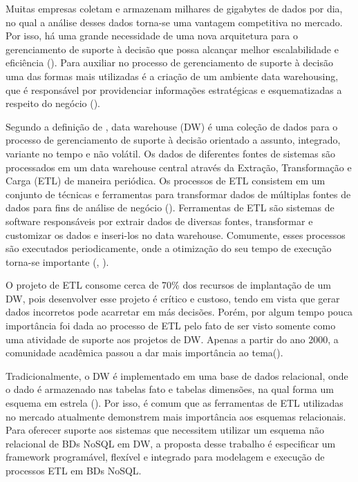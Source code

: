 Muitas empresas coletam e armazenam milhares de gigabytes de dados por dia, no qual a análise desses dados torna-se uma vantagem competitiva no mercado. Por isso, há uma grande necessidade de uma nova arquitetura para o gerenciamento de suporte à decisão que possa alcançar melhor escalabilidade e eficiência (\cite{liu:2013}). Para auxiliar no processo de gerenciamento de suporte à decisão uma das formas mais utilizadas é a criação de um ambiente data warehousing, que é responsável por providenciar informações estratégicas e esquematizadas a respeito do negócio (\cite{dayal:1997}).

Segundo a definição de \cite{kimball:2002}, data warehouse (DW) é uma coleção de dados para o processo de gerenciamento de suporte à decisão orientado a assunto, integrado, variante no tempo e não volátil. Os dados de diferentes fontes de sistemas são processados em um data warehouse central através da Extração, Transformação e Carga (ETL) de maneira periódica. Os processos de ETL consistem em um conjunto de técnicas e ferramentas para transformar dados de múltiplas fontes de dados para fins de análise de negócio (\cite{silva:2016}). Ferramentas de ETL são sistemas de software responsáveis por extrair dados de diversas fontes, transformar e customizar os dados e inseri-los no data warehouse. Comumente, esses processos são executados periodicamente, onde a otimização do seu tempo de execução torna-se importante (\cite{vassiliadis:2005}, \cite{silva:2016}).

O projeto de ETL consome cerca de 70\% dos recursos de implantação de um DW, pois desenvolver esse projeto é crítico e custoso, tendo em vista que gerar dados incorretos pode acarretar em más decisões. Porém, por algum tempo pouca importância foi dada ao processo de ETL pelo fato de ser visto somente como uma atividade de suporte aos projetos de DW. Apenas a partir do ano 2000, a comunidade acadêmica passou a dar mais importância ao tema(\cite{silva:2012}).

Tradicionalmente, o DW é implementado em uma base de dados relacional, onde o dado é armazenado nas tabelas fato e tabelas dimensões, na qual forma um esquema em estrela (\cite{kimball:2002}). Por isso, é comum que as ferramentas de ETL utilizadas no mercado atualmente demonstrem mais importância aos esquemas relacionais. Para oferecer suporte aos sistemas que necessitem utilizar um esquema não relacional de BDs NoSQL em DW, a proposta desse trabalho é especificar um framework programável, flexível e integrado para modelagem e execução de processos ETL em BDs NoSQL.


